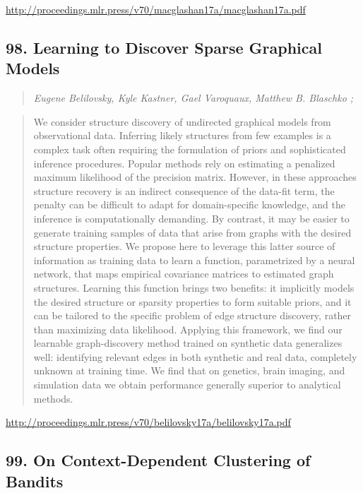 \documentclass{article}
\begin{document}
\href{http://proceedings.mlr.press/v70/macglashan17a/macglashan17a.pdf}{http://proceedings.mlr.press/v70/macglashan17a/macglashan17a.pdf}

\subsection{98. Learning to Discover Sparse Graphical Models}

\begin{quote}
\footnotesize{\textit{Eugene Belilovsky, Kyle Kastner, Gael Varoquaux, Matthew B. Blaschko ;}}

\end{quote}

\begin{quote}
    We consider structure discovery of undirected graphical models from observational data. Inferring likely structures from few examples is a complex task often requiring the formulation of priors and sophisticated inference procedures. Popular methods rely on estimating a penalized maximum likelihood of the precision matrix. However, in these approaches structure recovery is an indirect consequence of the data-fit term, the penalty can be difficult to adapt for domain-specific knowledge, and the inference is computationally demanding. By contrast, it may be easier to generate training samples of data that arise from graphs with the desired structure properties. We propose here to leverage this latter source of information as training data to learn a function, parametrized by a neural network, that maps empirical covariance matrices to estimated graph structures. Learning this function brings two benefits: it implicitly models the desired structure or sparsity properties to form suitable priors, and it can be tailored to the specific problem of edge structure discovery, rather than maximizing data likelihood. Applying this framework, we find our learnable graph-discovery method trained on synthetic data generalizes well: identifying relevant edges in both synthetic and real data, completely unknown at training time. We find that on genetics, brain imaging, and simulation data we obtain performance generally superior to analytical methods.  
\end{quote}

\href{http://proceedings.mlr.press/v70/belilovsky17a/belilovsky17a.pdf}{http://proceedings.mlr.press/v70/belilovsky17a/belilovsky17a.pdf}

\subsection{99. On Context-Dependent Clustering of Bandits}
\end{document}
